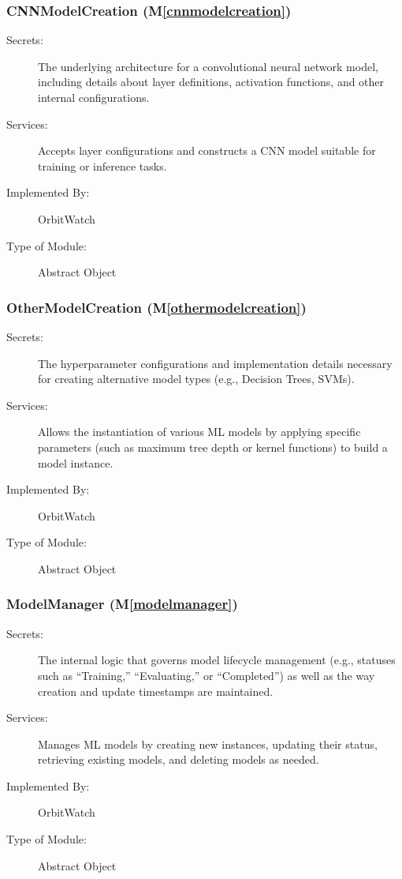\documentclass[12pt, titlepage]{article}
\newcommand{\mref}[1]{M\ref{#1}}
\begin{document}
\subsubsection{CNNModelCreation (\mref{cnnmodelcreation})}
\begin{description}
  \item[Secrets:] 
    The underlying architecture for a convolutional neural network model, including
    details about layer definitions, activation functions, and other internal
    configurations.
  \item[Services:] 
    Accepts layer configurations and constructs a CNN model suitable for training
    or inference tasks.
  \item[Implemented By:] 
    OrbitWatch
  \item[Type of Module:] 
    Abstract Object
\end{description}

\subsubsection{OtherModelCreation (\mref{othermodelcreation})}
\begin{description}
  \item[Secrets:] 
    The hyperparameter configurations and implementation details necessary for
    creating alternative model types (e.g., Decision Trees, SVMs).
  \item[Services:] 
    Allows the instantiation of various ML models by applying specific parameters
    (such as maximum tree depth or kernel functions) to build a model instance.
  \item[Implemented By:] 
    OrbitWatch
  \item[Type of Module:] 
    Abstract Object
\end{description}

\subsubsection{ModelManager (\mref{modelmanager})}
\begin{description}
  \item[Secrets:] 
    The internal logic that governs model lifecycle management (e.g., statuses such
    as ``Training,'' ``Evaluating,'' or ``Completed'') as well as the way creation and
    update timestamps are maintained.
  \item[Services:] 
    Manages ML models by creating new instances, updating their status, retrieving
    existing models, and deleting models as needed.
  \item[Implemented By:] 
    OrbitWatch
  \item[Type of Module:] 
    Abstract Object
\end{description}
\end{document}
